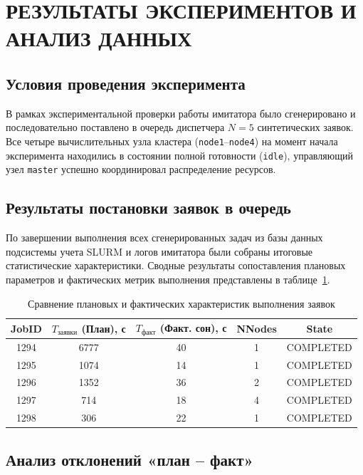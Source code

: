 \newpage
\section{РЕЗУЛЬТАТЫ ЭКСПЕРИМЕНТОВ И АНАЛИЗ ДАННЫХ}

\subsection{Условия проведения эксперимента}

В рамках экспериментальной проверки работы имитатора было сгенерировано
и последовательно поставлено в очередь диспетчера $N = 5$ синтетических заявок. 
Все четыре вычислительных узла кластера (\texttt{node1}--\texttt{node4}) на момент 
начала эксперимента находились в состоянии полной готовности (\texttt{idle}), управляющий 
узел \texttt{master} успешно координировал распределение ресурсов.

\subsection{Результаты постановки заявок в очередь}

По завершении выполнения всех сгенерированных задач из базы данных подсистемы 
учета SLURM и логов имитатора были собраны итоговые статистические характеристики. 
Сводные результаты сопоставления плановых параметров и фактических метрик выполнения 
представлены в таблице~\ref{tab:results}.

\begin{table}[H]
\caption{Сравнение плановых и фактических характеристик выполнения заявок}
\label{tab:results}
\centering
\begin{tabular}{|c|c|c|c|c|}
\hline
JobID & $T_{\text{заявки}}$ (План), с & $T_{\text{факт}}$ (Факт. сон), с & NNodes & State \\
\hline
1294 & 6777 & 40 & 1 & COMPLETED \\
1295 & 1074 & 14 & 1 & COMPLETED \\
1296 & 1352 & 36 & 2 & COMPLETED \\
1297 & 714  & 18 & 4 & COMPLETED \\
1298 & 306  & 22 & 1 & COMPLETED \\
\hline
\end{tabular}
\end{table}

\subsection{Анализ отклонений «план -- факт»}

